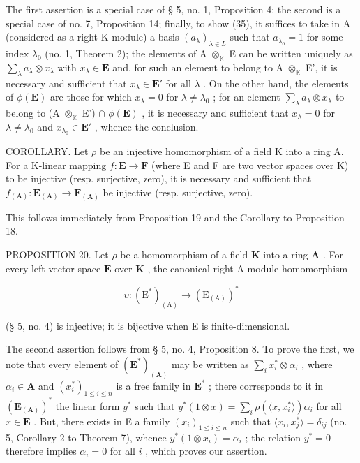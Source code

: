 The first assertion is a special case of § 5, no. 1, Proposition 4; the second is a special case of no. 7, Proposition 14; finally, to show (35), it suffices to take in A (considered as a right K-module) a basis \((a_{\lambda})_{\lambda \in L}\) such that \(a_{\lambda_0} = 1\) for some index \(\lambda_0\) (no. 1, Theorem 2); the elements of A \(\otimes_{\mathbb{K}}\) E can be written uniquely as \(\sum_{\lambda} a_{\lambda} \otimes x_{\lambda}\) with \(x_{\lambda} \in \mathbf{E}\) and, for such an element to belong to A \(\otimes_{\mathbb{K}}\) E', it is necessary and sufficient that \(x_{\lambda} \in \mathbf{E}'\) for all \(\lambda\) . On the other hand, the elements of \(\phi(\mathbf{E})\) are those for which \(x_{\lambda} = 0\) for \(\lambda \neq \lambda_0\) ; for an element \(\sum_{\lambda} a_{\lambda} \otimes x_{\lambda}\) to belong to (A \(\otimes_{\mathbb{K}}\) E') \(\cap\) \(\phi(\mathbf{E})\) , it is necessary and sufficient that \(x_{\lambda} = 0\) for \(\lambda \neq \lambda_0\) and \(x_{\lambda_0} \in \mathbf{E}'\) , whence the conclusion.

COROLLARY. Let \(\rho\) be an injective homomorphism of a field K into a ring A. For a K-linear mapping \(f: \mathbf{E} \to \mathbf{F}\) (where E and F are two vector spaces over K) to be injective (resp. surjective, zero), it is necessary and sufficient that \(f_{(\mathbf{A})}: \mathbf{E}_{(\mathbf{A})} \to \mathbf{F}_{(\mathbf{A})}\) be injective (resp. surjective, zero).

This follows immediately from Proposition 19 and the Corollary to Proposition 18.

PROPOSITION 20. Let \(\rho\) be a homomorphism of a field \(\mathbf{K}\) into a ring \(\mathbf{A}\) . For every left vector space \(\mathbf{E}\) over \(\mathbf{K}\) , the canonical right A-module homomorphism

\[
\upsilon : \left(\mathrm{E} ^ {*}\right) _ {(\mathrm{A})} \rightarrow \left(\mathrm{E} _ {(\mathrm{A})}\right) ^ {*}
\]

(§ 5, no. 4) is injective; it is bijective when E is finite-dimensional.

The second assertion follows from § 5, no. 4, Proposition 8. To prove the first, we note that every element of \((\mathbf{E}^{*})_{(\mathbf{A})}\) may be written as \(\sum_{i} x_{i}^{*} \otimes \alpha_{i}\) , where \(\alpha_{i} \in \mathbf{A}\) and \((x_{i}^{*})_{1 \leqslant i \leqslant n}\) is a free family in \(\mathbf{E}^{*}\) ; there corresponds to it in \((\mathbf{E}_{(\mathbf{A})})^{*}\) the linear form \(y^{*}\) such that \(y^{*}(1 \otimes x) = \sum_{i} \rho(\langle x, x_{i}^{*} \rangle)\alpha_{i}\) for all \(x \in \mathbf{E}\) . But, there exists in E a family \((x_{i})_{1 \leqslant i \leqslant n}\) such that \(\langle x_{i}, x_{j}^{*} \rangle = \delta_{ij}\) (no. 5, Corollary 2 to Theorem 7), whence \(y^{*}(1 \otimes x_{i}) = \alpha_{i}\) ; the relation \(y^{*} = 0\) therefore implies \(\alpha_{i} = 0\) for all \(i\) , which proves our assertion.

